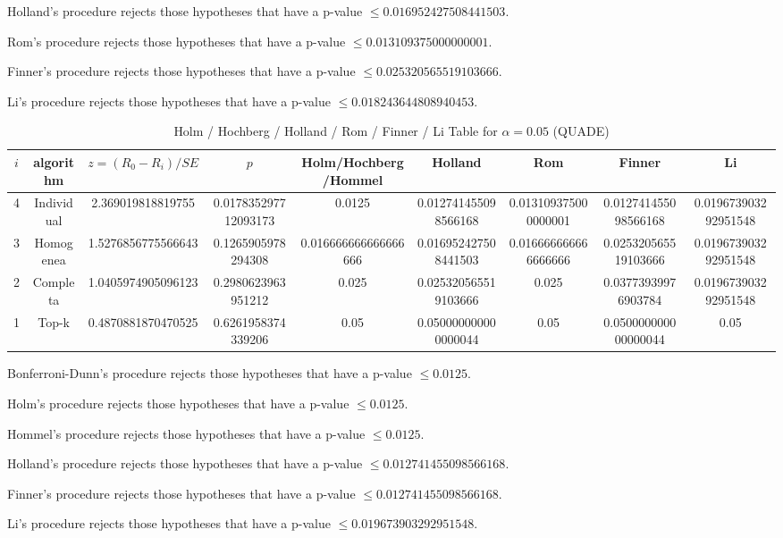\documentclass[a4paper,10pt]{article}
\begin{document}
\begin{landscape}
Holland's procedure rejects those hypotheses that have a p-value $\le0.016952427508441503$.


Rom's procedure rejects those hypotheses that have a p-value $\le0.013109375000000001$.


Finner's procedure rejects those hypotheses that have a p-value $\le0.025320565519103666$.


Li's procedure rejects those hypotheses that have a p-value $\le0.018243644808940453$.



\newpage

\begin{table}[!htp]
\centering\scriptsize
\caption{Holm / Hochberg / Holland / Rom / Finner / Li Table for $\alpha=0.05$ (QUADE)}
\begin{tabular}{ccccccccc}
$i$&algorithm&$z=(R_0 - R_i)/SE$&$p$&Holm/Hochberg/Hommel&Holland&Rom&Finner&Li\\
\hline
4&Individual&2.369019818819755&0.017835297712093173&0.0125&0.012741455098566168&0.013109375000000001&0.012741455098566168&0.019673903292951548\\
3&Homogenea&1.5276856775566643&0.1265905978294308&0.016666666666666666&0.016952427508441503&0.016666666666666666&0.025320565519103666&0.019673903292951548\\
2&Completa&1.0405974905096123&0.2980623963951212&0.025&0.025320565519103666&0.025&0.03773939976903784&0.019673903292951548\\
1&Top-k&0.4870881870470525&0.6261958374339206&0.05&0.050000000000000044&0.05&0.050000000000000044&0.05\\
\hline
\end{tabular}
\end{table}
Bonferroni-Dunn's procedure rejects those hypotheses that have a p-value $\le0.0125$.


Holm's procedure rejects those hypotheses that have a p-value $\le0.0125$.


Hommel's procedure rejects those hypotheses that have a p-value $\le0.0125$.


Holland's procedure rejects those hypotheses that have a p-value $\le0.012741455098566168$.


Finner's procedure rejects those hypotheses that have a p-value $\le0.012741455098566168$.


Li's procedure rejects those hypotheses that have a p-value $\le0.019673903292951548$.



\newpage


\end{landscape}
\end{document}
